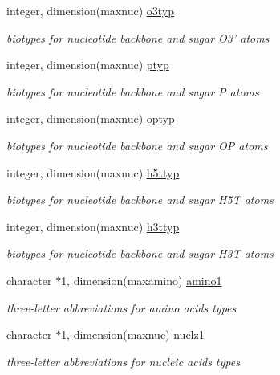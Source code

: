 \begin{DoxyCompactItemize}
integer, dimension(maxnuc) \hyperlink{classresdue_a95d0afec50d06f37606365889c369461}{o3typ}
\begin{DoxyCompactList}\small\item\em biotypes for nucleotide backbone and sugar O3' atoms \end{DoxyCompactList}\item 
integer, dimension(maxnuc) \hyperlink{classresdue_a40674f05ab57e66b0176b1f62b3e9af1}{ptyp}
\begin{DoxyCompactList}\small\item\em biotypes for nucleotide backbone and sugar P atoms \end{DoxyCompactList}\item 
integer, dimension(maxnuc) \hyperlink{classresdue_a6286d8a51141e8261fe20877c7910220}{optyp}
\begin{DoxyCompactList}\small\item\em biotypes for nucleotide backbone and sugar O\-P atoms \end{DoxyCompactList}\item 
integer, dimension(maxnuc) \hyperlink{classresdue_ada509c4f4faf38d11b7074364318f24f}{h5ttyp}
\begin{DoxyCompactList}\small\item\em biotypes for nucleotide backbone and sugar H5\-T atoms \end{DoxyCompactList}\item 
integer, dimension(maxnuc) \hyperlink{classresdue_a6002cb84b9ca25f2776d1020ca1fbb5c}{h3ttyp}
\begin{DoxyCompactList}\small\item\em biotypes for nucleotide backbone and sugar H3\-T atoms \end{DoxyCompactList}\item 
character $\ast$1, dimension(maxamino) \hyperlink{classresdue_ad1edc9b99c91a6e19f753eb94b674bb2}{amino1}
\begin{DoxyCompactList}\small\item\em three-\/letter abbreviations for amino acids types \end{DoxyCompactList}\item 
character $\ast$1, dimension(maxnuc) \hyperlink{classresdue_a01035bf726114e5ebe4baa0703e0b030}{nuclz1}
\begin{DoxyCompactList}\small\item\em three-\/letter abbreviations for nucleic acids types \end{DoxyCompactList}\item 

\end{DoxyCompactItemize}
